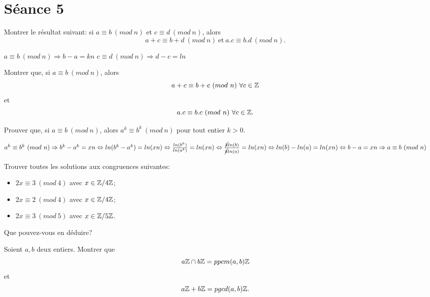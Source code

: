 
\section{Séance 5}

\begin{exo}
Montrer le r\'esultat suivant: si $a\equiv b ~(mod~n)$ et $c\equiv d ~(mod~n)$, alors
$$ a+c \equiv b+d ~(mod~n) ~\mathrm{et}~ a.c \equiv b.d ~(mod~n).$$
\end{exo}

$a\equiv b ~(mod~n) \Rightarrow b - a = kn $ \hspace{1cm} $c\equiv d ~(mod~n) \Rightarrow d - c = ln $ \\

\vspace*{0.8cm}
\begin{exo}
Montrer que, si $a\equiv b ~(mod~n)$, alors $$a+c\equiv b+c ~(mod~n) ~\forall c \in \mathbb{Z}$$ et $$a.c\equiv b.c ~(mod~n) ~\forall c \in \mathbb{Z}.$$ 
\end{exo}

\vspace*{0.8cm}
\begin{exo}
Prouver que, si $a\equiv b ~(mod~n)$, alors $a^k\equiv b^k ~(mod~n)$ pour tout entier $k>0$.
\end{exo}

$a^{k}\equiv b^{k} ~(mod~n) \Rightarrow b^{k} - a^{k} = xn \Leftrightarrow ln(b^{k} - a^{k}) = ln(xn) \Leftrightarrow \frac{ln(b^{k})}{ln(a^k)} = ln(xn) \Leftrightarrow \frac{\cancel{k}ln(b)}{\cancel{k}ln(a)} = ln(xn) \Leftrightarrow ln(b) - ln(a) = ln(xn) \Leftrightarrow b - a = xn \Rightarrow a\equiv b ~(mod~n)$

\vspace*{0.8cm}
\begin{exo}
Trouver toutes les solutions aux congruences suivantes:
\begin{itemize}
\item $2x \equiv 3 ~(mod~4)$ avec $x \in \mathbb{Z}/4\mathbb{Z}$;
\item $2x \equiv 2 ~(mod~4)$ avec $x \in \mathbb{Z}/4\mathbb{Z}$;
\item $2x \equiv 3 ~(mod~5)$ avec $x \in \mathbb{Z}/5\mathbb{Z}$.
\end{itemize}
Que pouvez-vous en d\'eduire?
\end{exo}

\vspace*{0.8cm}
\begin{exo}
Soient $a,b$ deux entiers. Montrer que $$a\mathbb{Z} \cap b\mathbb{Z} = ppcm(a,b)\mathbb{Z}$$ et $$ a\mathbb{Z} + b\mathbb{Z} = pgcd(a,b)\mathbb{Z}.$$
\end{exo}

